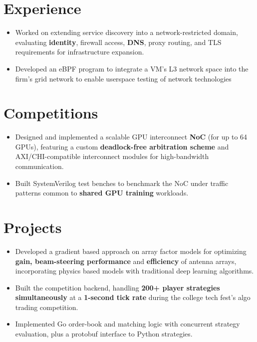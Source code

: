 \documentclass[a4paper, 11px]{article}
\begin{document}
\section{Experience}
\resumeSubHeadingListStart
{}
\begin{itemize}
    \item Worked on extending service discovery into a network-restricted domain, evaluating \textbf{identity}, firewall access, \textbf{DNS}, proxy routing, and TLS requirements for infrastructure expansion.
    \item Developed an eBPF program to integrate a VM's L3 network space into the firm's grid network to enable userspace testing of network technologies
\end{itemize}
\resumeSubHeadingListEnd
\section{Competitions}
\resumeSubHeadingListStart
{}
\begin{itemize}
\item Designed and implemented a scalable GPU interconnect \textbf{NoC} (for up to 64 GPUs), featuring a custom \textbf{deadlock-free arbitration scheme} and AXI/CHI-compatible interconnect modules for high-bandwidth communication.
\item Built SystemVerilog test benches to benchmark the NoC under traffic patterns common to \textbf{shared GPU training} workloads.
\end{itemize}
\resumeSubHeadingListEnd
\section{Projects}
\resumeSubHeadingListStart
{}
\begin{itemize}
\item Developed a gradient based approach on array factor models for optimizing \textbf{gain, beam-steering performance} and \textbf{efficiency} of antenna arrays, incorporating physics based models with traditional deep learning algorithms.
\end{itemize}
\begin{itemize}
\item Built the competition backend, handling \textbf{200+ player strategies simultaneously} at a \textbf{1-second tick rate} during the college tech fest's algo trading competition.
\item Implemented Go order-book and matching logic with concurrent strategy evaluation, plus a protobuf interface to Python strategies.
\end{itemize}
\resumeSubHeadingListEnd
\end{document}
